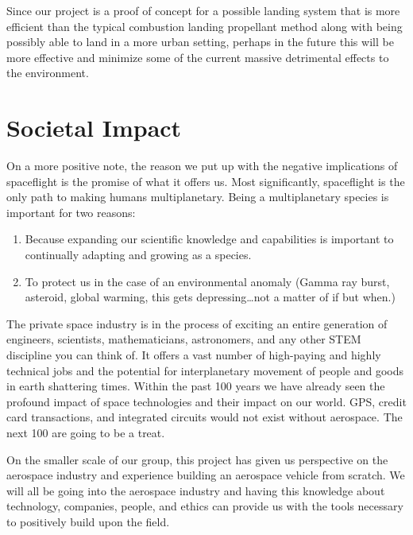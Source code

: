 Since our project is a proof of concept for a possible landing system that is more efficient than the typical combustion landing propellant method along with being possibly able to land in a more urban setting, perhaps in the future this will be more effective and minimize some of the current massive detrimental effects to the environment.

\section{Societal Impact}
On a more positive note, the reason we put up with the negative implications of spaceflight is the promise of what it offers us. Most significantly, spaceflight is the only path to making humans multiplanetary. Being a multiplanetary species is important for two reasons:

\begin{enumerate}
    \item Because expanding our scientific knowledge and capabilities is important to continually adapting and growing as a species.
    \item To protect us in the case of an environmental anomaly (Gamma ray burst, asteroid, global warming, this gets depressing…not a matter of if but when.) 
\end{enumerate}

The private space industry is in the process of exciting an entire generation of engineers, scientists, mathematicians, astronomers, and any other STEM discipline you can think of. It offers a vast number of high-paying and highly technical jobs and the potential for interplanetary movement of people and goods in earth shattering times. Within the past 100 years we have already seen the profound impact of space technologies and their impact on our world. GPS, credit card transactions, and integrated circuits would not exist without aerospace. The next 100 are going to be a treat. 

On the smaller scale of our group, this project has given us perspective on the aerospace industry and experience building an aerospace vehicle from scratch. We will all be going into the aerospace industry and having this knowledge about technology, companies, people, and ethics can provide us with the tools necessary to positively build upon the field. 
